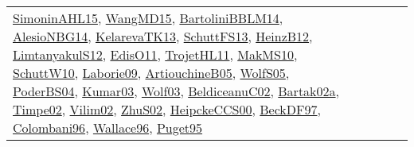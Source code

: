 {\begin{longtable}{lp{3cm}>{\raggedright}p{6cm}>{\raggedright}p{6cm}p{8cm}}
\href{articles/SimoninAHL15.pdf}{SimoninAHL15}\cite{SimoninAHL15}, \href{articles/WangMD15.pdf}{WangMD15}\cite{WangMD15}, \href{papers/BartoliniBBLM14.pdf}{BartoliniBBLM14}\cite{BartoliniBBLM14}, \href{papers/AlesioNBG14.pdf}{AlesioNBG14}\cite{AlesioNBG14}, \href{papers/KelarevaTK13.pdf}{KelarevaTK13}\cite{KelarevaTK13}, \href{papers/SchuttFS13.pdf}{SchuttFS13}\cite{SchuttFS13}, \href{papers/HeinzB12.pdf}{HeinzB12}\cite{HeinzB12}, \href{articles/LimtanyakulS12.pdf}{LimtanyakulS12}\cite{LimtanyakulS12}, \href{papers/EdisO11.pdf}{EdisO11}\cite{EdisO11}, \href{articles/TrojetHL11.pdf}{TrojetHL11}\cite{TrojetHL11}, \href{papers/MakMS10.pdf}{MakMS10}\cite{MakMS10}, \href{papers/SchuttW10.pdf}{SchuttW10}\cite{SchuttW10}, \href{papers/Laborie09.pdf}{Laborie09}\cite{Laborie09}, \href{papers/ArtiouchineB05.pdf}{ArtiouchineB05}\cite{ArtiouchineB05}, \href{papers/WolfS05.pdf}{WolfS05}\cite{WolfS05}, \href{articles/PoderBS04.pdf}{PoderBS04}\cite{PoderBS04}, \href{papers/Kumar03.pdf}{Kumar03}\cite{Kumar03}, \href{papers/Wolf03.pdf}{Wolf03}\cite{Wolf03}, \href{papers/BeldiceanuC02.pdf}{BeldiceanuC02}\cite{BeldiceanuC02}, \href{papers/Bartak02a.pdf}{Bartak02a}\cite{Bartak02a}, \href{articles/Timpe02.pdf}{Timpe02}\cite{Timpe02}, \href{papers/Vilim02.pdf}{Vilim02}\cite{Vilim02}, \href{papers/ZhuS02.pdf}{ZhuS02}\cite{ZhuS02}, \href{articles/HeipckeCCS00.pdf}{HeipckeCCS00}\cite{HeipckeCCS00}, \href{papers/BeckDF97.pdf}{BeckDF97}\cite{BeckDF97}, \href{papers/Colombani96.pdf}{Colombani96}\cite{Colombani96}, \href{articles/Wallace96.pdf}{Wallace96}\cite{Wallace96}, \href{papers/Puget95.pdf}{Puget95}\cite{Puget95}\\

\end{longtable}}
